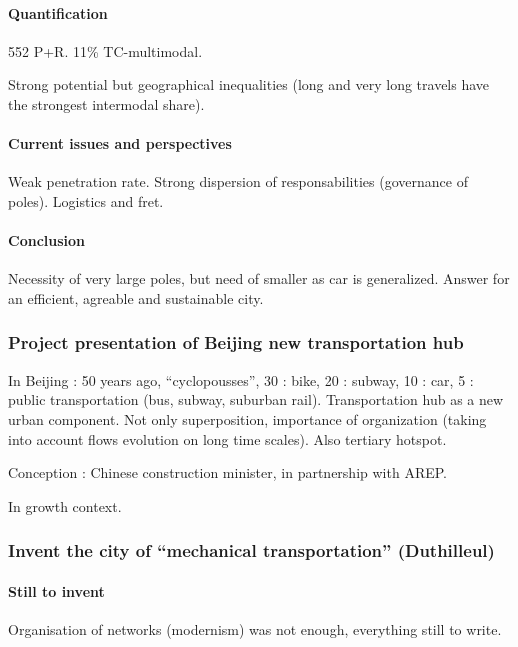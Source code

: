 \paragraph{Quantification}

552 P+R. 11\% TC-multimodal.

Strong potential but geographical inequalities (long and very long travels have the strongest intermodal share).

\paragraph{Current issues and perspectives}

Weak penetration rate. Strong dispersion of responsabilities (governance of poles). Logistics and fret.

\paragraph{Conclusion}

Necessity of very large poles, but need of smaller as car is generalized. Answer for an efficient, agreable and sustainable city.



\subsubsection{Project presentation of Beijing new transportation hub}

In Beijing : 50 years ago, ``cyclopousses'', 30 : bike, 20 : subway, 10 : car, 5 : public transportation (bus, subway, suburban rail). Transportation hub as a new urban component. Not only superposition, importance of organization (taking into account flows evolution on long time scales). Also tertiary hotspot.

Conception : Chinese construction minister, in partnership with AREP.

In growth context.


\subsubsection{Invent the city of ``mechanical transportation'' (Duthilleul)}

\paragraph{Still to invent}

Organisation of networks (modernism) was not enough, everything still to write.

